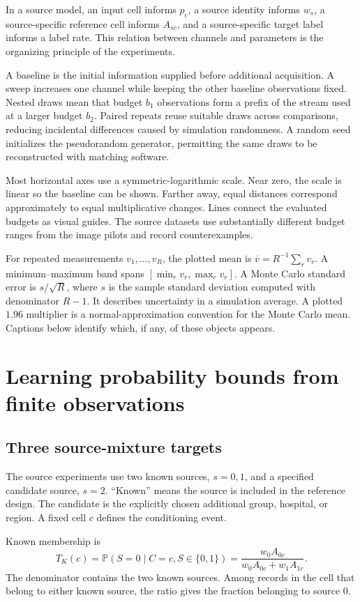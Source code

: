 \documentclass[11pt,a4paper]{report}
\newcommand{\Prob}{\mathbb P}
\begin{document}
In a source model, an input cell informs $p_c$, a source identity informs $w_s$, a source-specific reference cell informs $A_{sc}$, and a source-specific target label informs a label rate. This relation between channels and parameters is the organizing principle of the experiments.

A baseline is the initial information supplied before additional acquisition. A sweep increases one channel while keeping the other baseline observations fixed. Nested draws mean that budget $b_1$ observations form a prefix of the stream used at a larger budget $b_2$. Paired repeats reuse suitable draws across comparisons, reducing incidental differences caused by simulation randomness. A random seed initializes the pseudorandom generator, permitting the same draws to be reconstructed with matching software.

Most horizontal axes use a symmetric-logarithmic scale. Near zero, the scale is linear so the baseline can be shown. Farther away, equal distances correspond approximately to equal multiplicative changes. Lines connect the evaluated budgets as visual guides. The source datasets use substantially different budget ranges from the image pilots and record counterexamples.

For repeated measurements $v_1,\ldots,v_R$, the plotted mean is $\overline v=R^{-1}\sum_rv_r$. A minimum--maximum band spans $[\min_rv_r,\max_rv_r]$. A Monte Carlo standard error is $s/\sqrt R$, where $s$ is the sample standard deviation computed with denominator $R-1$. It describes uncertainty in a simulation average. A plotted $1.96$ multiplier is a normal-approximation convention for the Monte Carlo mean. Captions below identify which, if any, of these objects appears.

\chapter{Learning probability bounds from finite observations}
\section{Three source-mixture targets}
The source experiments use two known sources, $s=0,1$, and a specified candidate source, $s=2$. ``Known'' means the source is included in the reference design. The candidate is the explicitly chosen additional group, hospital, or region. A fixed cell $c$ defines the conditioning event.

Known membership is
\begin{equation}
T_K(c)=\Prob(S=0\mid C=c,S\in\{0,1\})
=\frac{w_0A_{0c}}{w_0A_{0c}+w_1A_{1c}}.
\end{equation}
The denominator contains the two known sources. Among records in the cell that belong to either known source, the ratio gives the fraction belonging to source 0.
\end{document}

